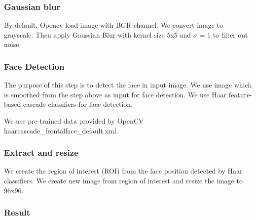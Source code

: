\documentclass[a4paper, 12pt]{article}
\begin{document}
\subsubsection{Gaussian blur}
By default, Opencv load image with BGR channel. We convert image to grayscale. Then apply Gaussian Blur with kernel size 5x5 and $\sigma$ = 1 to filter out noise.

\subsubsection{Face Detection}
The purpose of this step is to detect the face in input image. We use image which is smoothed from the step above as input for face detection. We use Haar feature-based cascade classifiers \cite{viola2001rapid} for face detection.

We use pre-trained data provided by OpenCV haarcascade\_frontalface\_default.xml. 

\subsubsection{Extract and resize}
We create the region of interest (ROI) from the face position detected by Haar classifiers. We create new image from region of interest and resize the image to 96x96.

\subsubsection{Result}
\end{document}
